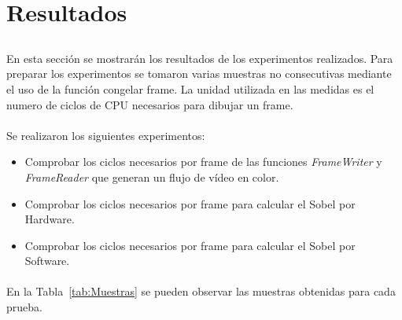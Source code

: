\documentclass[a4paper,12pt,titlepage,final]{book}
\begin{document}
\clearpage
\section{Resultados}
\subsection*{}
\subsubsection*{}

\paragraph{}
En esta sección se mostrarán los resultados de los experimentos realizados. Para preparar los experimentos se tomaron varias muestras no consecutivas mediante el uso de la función congelar frame. La unidad utilizada en las medidas es el numero de ciclos de CPU necesarios para dibujar un frame.


\paragraph{}
Se realizaron los siguientes experimentos:
\begin{itemize}
\item Comprobar los ciclos necesarios por frame de las funciones \textit{FrameWriter} y \textit{FrameReader} que generan un flujo de vídeo en color.
\item Comprobar los ciclos necesarios por frame para calcular el Sobel por Hardware.
\item Comprobar los ciclos necesarios por frame para calcular el Sobel por Software.
\end{itemize}

\paragraph{}
En la Tabla~\ref{tab:Muestras} se pueden observar las muestras obtenidas para cada prueba.
\end{document}
